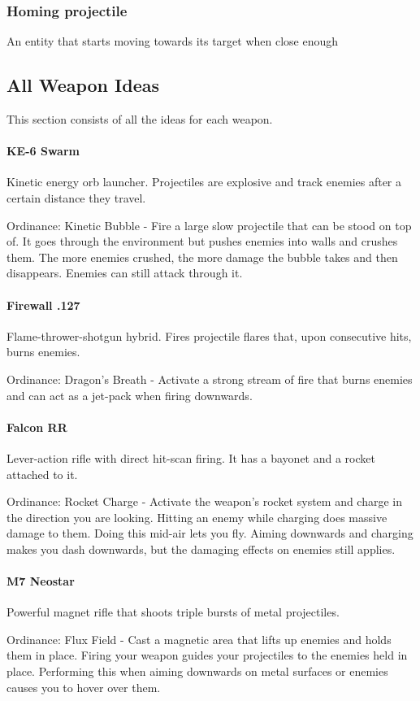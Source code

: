 \documentclass[../Main.tex]{subfiles}
\begin{document}
\subsubsection{Homing projectile}

An entity that starts moving towards its target when close enough


\subsection{All Weapon Ideas}

This section consists of all the ideas for each weapon.

\paragraph{KE-6 Swarm}

Kinetic energy orb launcher. Projectiles are explosive and track enemies after a certain distance they travel. 

Ordinance: Kinetic Bubble - Fire a large slow projectile that can be stood on top of. It goes through the environment but pushes enemies into walls and crushes them. The more enemies crushed, the more damage the bubble takes and then disappears. Enemies can still attack through it.

\paragraph{Firewall .127}

Flame-thrower-shotgun hybrid. Fires projectile flares that, upon consecutive hits, burns enemies.

Ordinance: Dragon's Breath - Activate a strong stream of fire that burns enemies and can act as a jet-pack when firing downwards.

\paragraph{Falcon RR}

Lever-action rifle with direct hit-scan firing. It has a bayonet and a rocket attached to it.

Ordinance: Rocket Charge - Activate the weapon's rocket system and charge in the direction you are looking. Hitting an enemy while charging does massive damage to them. Doing this mid-air lets you fly. Aiming downwards and charging makes you dash downwards, but the damaging effects on enemies still applies.

\paragraph{M7 Neostar}

Powerful magnet rifle that shoots triple bursts of metal projectiles. 

Ordinance: Flux Field - Cast a magnetic area that lifts up enemies and holds them in place. Firing your weapon guides your projectiles to the enemies held in place. Performing this when aiming downwards on metal surfaces or enemies causes you to hover over them.
\end{document}
